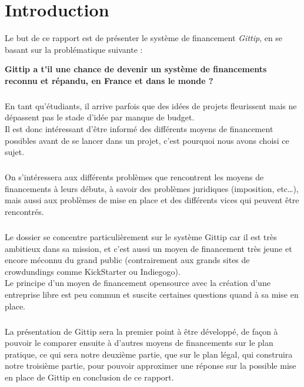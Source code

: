 \chapter*{Introduction}

Le but de ce rapport est de présenter le système de financement \emph{Gittip},
en se basant sur la problématique suivante :

\begin{center}
\textbf{Gittip a t'il une chance de devenir un système de
financements reconnu et répandu, en France et dans le monde ?}
\end{center}

\paragraph{}
En tant qu'étudiants, il arrive parfois que des idées de projets fleurissent
mais ne dépassent pas le stade d'idée par manque de budget.\\
Il est donc intéressant d'être informé des différents moyens de financement
possibles avant de se lancer dans un projet, c'est pourquoi nous avons
choisi ce sujet.

\paragraph{}
On s'intéressera aux différents problèmes que rencontrent les moyens
de financements à leurs débuts, à savoir des problèmes juridiques
(imposition, etc\ldots), mais aussi aux problèmes de mise en place et des
différents vices qui peuvent être rencontrés.

\paragraph{}
Le dossier se concentre particulièrement sur le système Gittip car il
est très ambitieux dans sa mission, et c'est aussi un moyen de financement
très jeune et encore méconnu du grand public (contrairement aux grands sites
de crowdundings comme KickStarter ou Indiegogo).\\
Le principe d'un moyen de financement opensource avec la création d'une
entreprise libre est peu commun et suscite certaines questions quand à sa
mise en place.

\paragraph{}
La présentation de Gittip sera la premier point à être développé, de
façon à pouvoir le comparer ensuite à d'autres moyens de financements
sur le plan pratique, ce qui sera notre deuxième partie,
que sur le plan légal, qui construira notre troisième partie, pour pouvoir
approximer une réponse sur la possible mise en place de Gittip en conclusion
de ce rapport.
